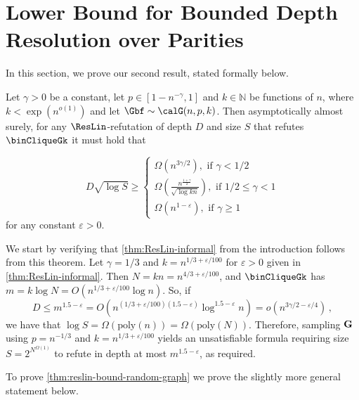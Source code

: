 \section{Lower Bound for Bounded Depth Resolution over Parities}
\label{sec:binCliqueResLin}


In this section, we prove our second result, stated formally below.



\begin{theorem}
    \label{thm:reslin-bound-random-graph}
    Let $\gamma>0$ be a constant, let $p\in [1-n^{-\gamma},1]$ and $k \in\mathbb{N}$  be functions of $n$, where $k < \exp(n^{o(1)})$ and let $\Gbf\sim \calG(n,p,k)$. Then asymptotically almost surely, for any $\ResLin$-refutation of depth $D$ and size $S$ that refutes $\binCliqueGk$ it must hold that
    
    \begin{equation*}
    D\sqrt{\log S}\geq
        \begin{cases}
            \Omega(n^{3\gamma/2}), \text{ if } \gamma < 1/2\\
            \Omega(\frac{n^{\frac{1+\gamma}{2}}}{\sqrt{\log kn}}), \text{ if } 1/2\leq \gamma < 1\\
            \Omega(n^{1-\varepsilon}), \text{ if } \gamma \ge 1 
        \end{cases}
    \end{equation*}
    for any constant $\varepsilon > 0$.
\end{theorem}
We start by verifying that \autoref{thm:ResLin-informal} from the introduction follows from this theorem. Let $\gamma= 1/3$ and $k=n^{1/3+\varepsilon/100}$ for $\varepsilon>0$ given in \autoref{thm:ResLin-informal}.
    Then $N=kn=n^{4/3+\varepsilon/100}$, and $\binCliqueGk$ has $m= k\log N = 
    O(n^{1/3+\varepsilon/100}\log n)$. 
    So, if 
    \begin{equation*}
    D\leq m^{1.5-\varepsilon}=O(n^{(1/3+\varepsilon/100)(1.5-\varepsilon)}\log^{1.5-\varepsilon} n)=o(n^{3\gamma/2-\varepsilon/4})\,,
    \end{equation*}
    we have that $\log S= \Omega(\textrm{poly}(n))=\Omega(\textrm{poly}(N))$. Therefore, sampling $\bf G$ using $p=n^{-1/3}$ and $k=n^{1/3+\varepsilon/100}$  \aas yields an unsatisfiable formula requiring size $S= 2^{N^{\Omega(1)}}$ to refute in depth at most $m^{1.5-\varepsilon}$, as required.

To prove \autoref{thm:reslin-bound-random-graph} we prove the slightly more general statement below. 
 

